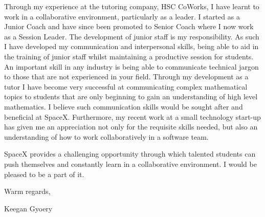 \documentclass[a4paper,11pt]{article}
\begin{document}
Through my experience at the tutoring company, HSC CoWorks, I have learnt to work in a collaborative environment, particularly as a leader. I started as a Junior Coach and have since been promoted to Senior Coach where I now work as a Session Leader. The development of junior staff is my responsibility. As such I have developed my communication and interpersonal skills, being able to aid in the training of junior staff whilst maintaining a productive session for students. An important skill in any industry is being able to communicate technical jargon to those that are not experienced in your field. Through my development as a tutor I have become very successful at communicating complex mathematical topics to students that are only beginning to gain an understanding of high level mathematics. I believe such communication skills would be sought after and beneficial at SpaceX. Furthermore, my recent work at a small technology start-up has given me an appreciation not only for the requisite skills needed, but also an understanding of how to work collaboratively in a software team.\par

SpaceX provides a challenging opportunity through which talented students can push themselves and constantly learn in a collaborative environment. I would be pleased to be a part of it. \par

Warm regards, \par

Keegan Gyoery
\end{document}
